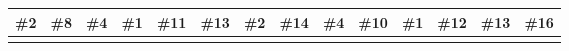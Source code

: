 \documentclass[12pt]{article}
\begin{document}
\noindent
\begin{tabular}{|*{14}{W|}} 
\hline
\textbf{\#2} & \textbf{\#8} & \textbf{\#4} & \textbf{\#1} & \textbf{\#11} & 
\textbf{\#13} & \textbf{\#2} & \textbf{\#14} & \textbf{\#4} & 
\textbf{\#10} & \textbf{\#1} & \textbf{\#12} & 
\textbf{\#13} & \textbf{\#16} \\
\hline
& & & & & & & & & & & & & \\
\hline
\end{tabular}
\begin{comment}
\section*{Line Table Key}
\noindent %
\begin{tabular}{|*{14}{W|}} 
\hline
\textbf{\#7} & \textbf{\#9} & \textbf{\#1} & \textbf{\#2} & 
\textbf{\#10} & \textbf{\#2} & \textbf{\#3} & \textbf{\#9} & 
\textbf{\#5} & \textbf{\#6} & \textbf{\#2} & 
\textbf{\#12} & \textbf{\#15} & \textbf{\#20} \\

\hline
\textbf{C} & \textbf{A} & \textbf{N} & \textbf{\_} & 
\textbf{I} & \textbf{\_} & \textbf{H} & \textbf{A} & 
\textbf{V} & \textbf{E} & \textbf{\_} &
\textbf{T} & \textbf{W} & \textbf{O} \\
\hline
\end{tabular}

\vspace{1em} %

\noindent
\begin{tabular}{|*{14}{W|}} 
\hline
\textbf{\#8} & \textbf{\#4} & \textbf{\#1} & \textbf{\#11} & 
\textbf{\#13} & \textbf{\#2} & \textbf{\#14} & \textbf{\#4} & 
\textbf{\#10} & \textbf{\#1} & \textbf{\#12} & 
\textbf{\#13} & \textbf{\#16} & \textbf{:D} \\
\hline
\textbf{B} & \textbf{O} & \textbf{N} & \textbf{U} & 
\textbf{S} & \textbf{\_} & \textbf{P} & \textbf{O} & 
\textbf{I} & \textbf{N} & \textbf{T} & 
\textbf{S} & \textbf{?} & \textbf{:D} \\
\hline
\end{tabular}
\end{comment}
\vspace{10cm}
\setcounter{section}{0}
\end{document}
